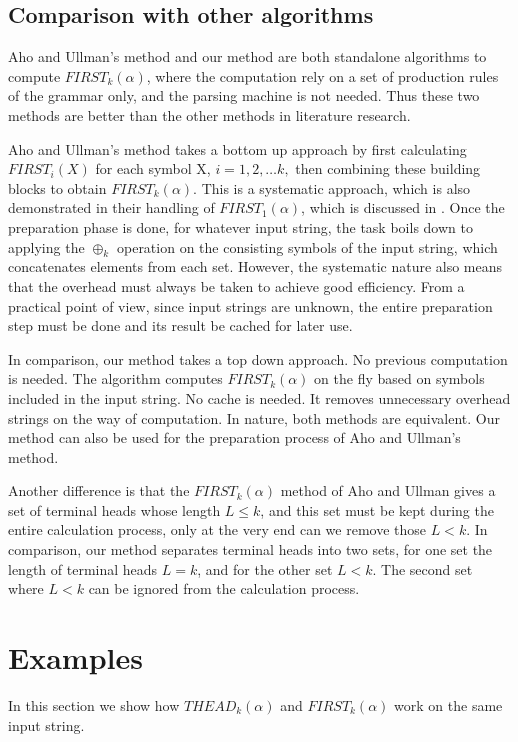 \documentclass{sig-alternate-05-2015}
\begin{document}
\subsection{Comparison with other algorithms}
Aho and Ullman’s method and our method are both
standalone algorithms to compute $FIRST_k(\alpha)$, where the
computation rely on a set of production rules of the grammar
only, and the parsing machine is not needed. Thus
these two methods are better than the other methods in
literature research.

Aho and Ullman’s method takes a bottom up approach
by first calculating $FIRST_i(X)$ for each symbol X, $i = 1, 2,
\ldots k,$ then combining these building blocks to obtain
$FIRST_k(\alpha)$. This is a systematic approach, which is also
demonstrated in their handling of $FIRST_1(\alpha)$, which is
discussed in \cite{aho86compiler}. Once the preparation phase is
done, for whatever input string, the task boils down to
applying the $\oplus_k$ operation on the consisting symbols of
the input string, which concatenates elements from each
set. However, the systematic nature also means that the
overhead must always be taken to achieve good efficiency.
From a practical point of view, since input strings are unknown,
the entire preparation step must be done and its
result be cached for later use.

In comparison, our method takes a top down approach.
No previous computation is needed. The algorithm computes
$FIRST_k(\alpha)$ on the fly based on symbols included in
the input string. No cache is needed. It removes unnecessary
overhead strings on the way of computation.
In nature, both methods are equivalent. Our method can
also be used for the preparation process of Aho and
Ullman’s method.

Another difference is that the $FIRST_k(\alpha)$ method of Aho
and Ullman gives a set of terminal heads whose length $L \leq
k$, and this set must be kept during the entire calculation
process, only at the very end can we remove those $L < k$. In
comparison, our method separates terminal heads into two
sets, for one set the length of terminal heads $L = k$, and for
the other set $L < k$. The second set where $L < k$ can be
ignored from the calculation process.

\section{Examples}
In this section we show how $THEAD_k(\alpha)$ and $FIRST_k(\alpha)$
work on the same input string.
\end{document}
